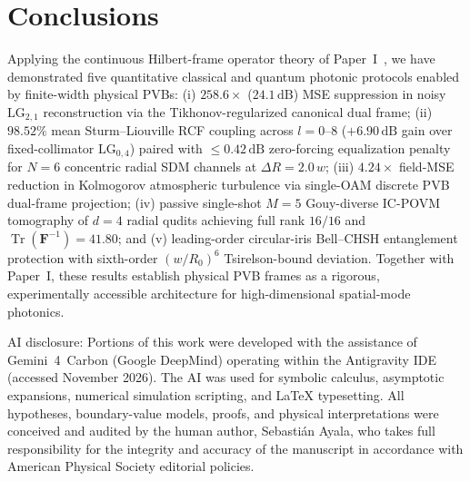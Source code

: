 \documentclass[aps,pra,onecolumn,notitlepage,11pt,tightenlines,nofootinbib,floatfix,longbibliography]{revtex4-2}
\begin{document}
\section{Conclusions}
\label{sec:conclusions}

Applying the continuous Hilbert-frame operator theory of Paper~I~\cite{AyalaPaperI}, we have demonstrated five quantitative classical and quantum photonic protocols enabled by finite-width physical PVBs: (i) $258.6\times$ ($24.1\,\mathrm{dB}$) MSE suppression in noisy $\mathrm{LG}_{2,1}$ reconstruction via the Tikhonov-regularized canonical dual frame; (ii) $98.52\%$ mean Sturm--Liouville RCF coupling across $l = 0\text{--}8$ ($+6.90\,\mathrm{dB}$ gain over fixed-collimator $\mathrm{LG}_{0,4}$) paired with $\le 0.42\,\mathrm{dB}$ zero-forcing equalization penalty for $N = 6$ concentric radial SDM channels at $\Delta R = 2.0\,w$; (iii) $4.24\times$ field-MSE reduction in Kolmogorov atmospheric turbulence via single-OAM discrete PVB dual-frame projection; (iv) passive single-shot $M = 5$ Gouy-diverse IC-POVM tomography of $d = 4$ radial qudits achieving full rank $16/16$ and $\operatorname{Tr}(\mathbf{F}^{-1}) = 41.80$; and (v) leading-order circular-iris Bell--CHSH entanglement protection with sixth-order $(w/R_0)^6$ Tsirelson-bound deviation. Together with Paper~I, these results establish physical PVB frames as a rigorous, experimentally accessible architecture for high-dimensional spatial-mode photonics.

\begin{acknowledgments}
AI disclosure: Portions of this work were developed with the assistance of Gemini~4~Carbon (Google DeepMind) operating within the Antigravity IDE (accessed November 2026). The AI was used for symbolic calculus, asymptotic expansions, numerical simulation scripting, and \LaTeX{} typesetting. All hypotheses, boundary-value models, proofs, and physical interpretations were conceived and audited by the human author, Sebasti\'an Ayala, who takes full responsibility for the integrity and accuracy of the manuscript in accordance with American Physical Society editorial policies.
\end{acknowledgments}
\end{document}

